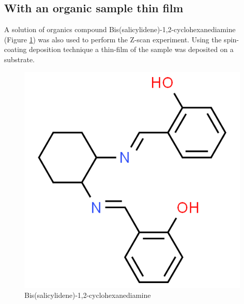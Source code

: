\documentclass[%
 reprint,
 amsmath,amssymb,
 aps,
]{revtex4-2}
\begin{document}
	\subsection{With an organic sample thin film}
		A solution of organics compound Bis(salicylidene)-1,2-cyclohexanediamine (Figure \ref{fig:org-s}) was also used to perform the Z-scan experiment. Using the spin-coating deposition technique a thin-film of the sample was deposited on a substrate.
		\begin{figure}\label{fig:org-s}
			\includegraphics[scale = 0.3]{org-s}
			\caption{Bis(salicylidene)-1,2-cyclohexanediamine}
		\end{figure}
\end{document}
